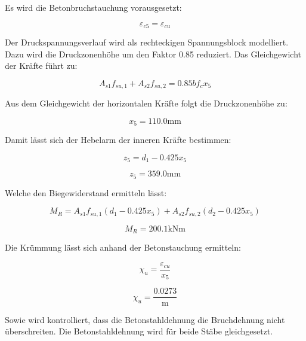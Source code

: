 \documentclass[
  12pt,
  letterpaper,
  egregdoesnotlikesansseriftitles]{scrreprt}
\begin{document}
Es wird die Betonbruchstauchung vorausgesetzt:

\begin{equation}\varepsilon_{c5} = \varepsilon_{cu}\end{equation}

Der Druckspannungsverlauf wird als rechteckigen Spannungsblock
modelliert. Dazu wird die Druckzonenhöhe um den Faktor 0.85 reduziert.
Das Gleichgewicht der Kräfte führt zu:

\begin{equation}A_{s 1} f_{su,1} + A_{s 2} f_{su,2} = 0.85 b f_{c} x_{5}\end{equation}

Aus dem Gleichgewicht der horizontalen Kräfte folgt die Druckzonenhöhe
zu:

\begin{equation}x_{5} = 110.0 \text{mm}\end{equation}

Damit lässt sich der Hebelarm der inneren Kräfte bestimmen:

\begin{equation}z_{5} = d_{1} - 0.425 x_{5}\end{equation}

\begin{equation}z_{5} = 359.0 \text{mm}\end{equation}

Welche den Biegewiderstand ermitteln lässt:

\begin{equation}M_{R} = A_{s 1} f_{su,1} \left(d_{1} - 0.425 x_{5}\right) + A_{s 2} f_{su,2} \left(d_{2} - 0.425 x_{5}\right)\end{equation}

\begin{equation}M_{R} = 200.1 \text{kN} \text{m}\end{equation}

Die Krümmung lässt sich anhand der Betonstauchung ermitteln:

\begin{equation}\chi_{u} = \frac{\varepsilon_{cu}}{x_{5}}\end{equation}

\begin{equation}\chi_{u} = \frac{0.0273}{\text{m}}\end{equation}

Sowie wird kontrolliert, dass die Betonstahldehnung die Bruchdehnung
nicht überschreiten. Die Betonstahldehnung wird für beide Stäbe
gleichgesetzt.
\end{document}
